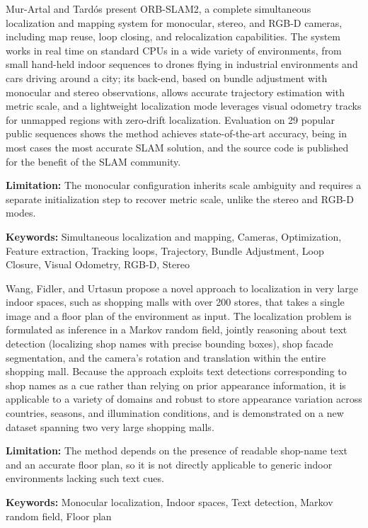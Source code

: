 {
	Mur-Artal and Tardós \cite{MurArtal:2017} present ORB-SLAM2, a complete simultaneous localization and mapping system for monocular, stereo, and RGB-D cameras, including map reuse, loop closing, and relocalization capabilities. The system works in real time on standard CPUs in a wide variety of environments, from small hand-held indoor sequences to drones flying in industrial environments and cars driving around a city; its back-end, based on bundle adjustment with monocular and stereo observations, allows accurate trajectory estimation with metric scale, and a lightweight localization mode leverages visual odometry tracks for unmapped regions with zero-drift localization. Evaluation on 29 popular public sequences shows the method achieves state-of-the-art accuracy, being in most cases the most accurate SLAM solution, and the source code is published for the benefit of the SLAM community.
	
	\bigskip
	\textbf{Limitation:} The monocular configuration inherits scale ambiguity and requires a separate initialization step to recover metric scale, unlike the stereo and RGB-D modes.
	
	\scriptsize{\textbf{Keywords:} Simultaneous localization and mapping, Cameras, Optimization, Feature extraction, Tracking loops, Trajectory, Bundle Adjustment, Loop Closure, Visual Odometry, RGB-D, Stereo}
}

{
	Wang, Fidler, and Urtasun \cite{Wang:2015} propose a novel approach to localization in very large indoor spaces, such as shopping malls with over 200 stores, that takes a single image and a floor plan of the environment as input. The localization problem is formulated as inference in a Markov random field, jointly reasoning about text detection (localizing shop names with precise bounding boxes), shop facade segmentation, and the camera's rotation and translation within the entire shopping mall. Because the approach exploits text detections corresponding to shop names as a cue rather than relying on prior appearance information, it is applicable to a variety of domains and robust to store appearance variation across countries, seasons, and illumination conditions, and is demonstrated on a new dataset spanning two very large shopping malls.
	
	\bigskip
	\textbf{Limitation:} The method depends on the presence of readable shop-name text and an accurate floor plan, so it is not directly applicable to generic indoor environments lacking such text cues.
	
	\scriptsize{\textbf{Keywords:} Monocular localization, Indoor spaces, Text detection, Markov random field, Floor plan}
}

